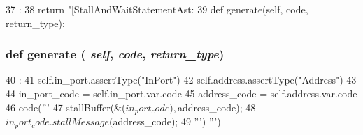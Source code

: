 \begin{DoxyCode}
37                       :
38         return "[StallAndWaitStatementAst: %
39 
    def generate(self, code, return_type):
\end{DoxyCode}
\hypertarget{classslicc_1_1ast_1_1StallAndWaitStatementAST_1_1StallAndWaitStatementAST_a4555d1cee0dccf3942ea35fe86de2e8e}{
\subsubsection[{generate}]{\setlength{\rightskip}{0pt plus 5cm}def generate ( {\em self}, \/   {\em code}, \/   {\em return\_\-type})}}
\label{classslicc_1_1ast_1_1StallAndWaitStatementAST_1_1StallAndWaitStatementAST_a4555d1cee0dccf3942ea35fe86de2e8e}



\begin{DoxyCode}
40                                          :
41         self.in_port.assertType("InPort")
42         self.address.assertType("Address")
43 
44         in_port_code = self.in_port.var.code
45         address_code = self.address.var.code
46         code('''
47         stallBuffer(&($in_port_code), $address_code);
48         $in_port_code.stallMessage($address_code);
49         ''')
        ''')
\end{DoxyCode}


